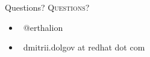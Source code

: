 \documentclass[usenames,dvipsnames, 18pt, compress, aspectratio=169]{beamer}
\def\twitter{{\faTwitter}}
\def\email{{\faEnvelope}}
\begin{document}
\fontsize{18pt}{18}\selectfont
\begin{frame}
  \vspace*{2.5cm}
  \begin{minipage}[b][\paperheight]{\textwidth}
  \begin{center}

      \linespread{1.0}%
      \if@noSmallCapitals%
        Questions?
      \else%
        \scshape{\color{black} Questions?}%
      \fi%
      \vspace*{0.3em}

      \fontsize{13pt}{14}\selectfont
        \begin{itemize}[label={}]
            \item {\color{black} \twitter\ @erthalion}
            \item {\color{black} \email\ dmitrii.dolgov at redhat dot com}
        \end{itemize}
      \vspace*{2.5em}%

    \vfill
    \vspace*{2em}
  \end{center}
  \end{minipage}
\end{frame}
\end{document}
